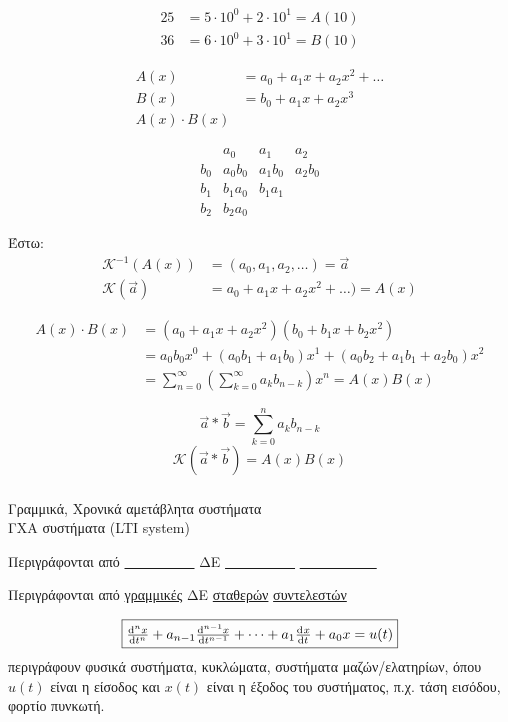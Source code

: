 \documentclass[11pt,a4paper,titlepage,final]{article}
\begin{document}
\begin{align*}
25 &= 5\cdot10^0+2\cdot10^1 = A(10)\\36&=6\cdot10^0+3\cdot10^1 = B(10)
\end{align*}


\begin{align*}
A(x) &= a_0 +a_1x+a_2x^2+\dots\\
B(x) &= b_0+a_1x+a_2x^3\\
A(x) \cdot B(x) &
\end{align*}

	\[
	\begin{array}{r|c|c|c}
	& a_0 & a_1 & a_2  \\ \hline
	b_0 & a_0b_0 & a_1b_0 & a_2b_0 \\ \hline
	b_1 & b_1a_0 & b_1a_1 & \\ \hline
	b_2 & b_2a_0 &        &
	\end{array}
	\]

Έστω: \begin{align*}
\mathscr K^{-1}\left(A(x)\right) &= (a_0,a_1,a_2,\dots) = \vec{a}\\
\mathscr K\left(\vec a\right) &= a_0+a_1x+a_2x^2+ \dots) = A(x)
\end{align*}

\begin{align*}
A(x)\cdot B(x) &= (a_0+a_1x+a_2x^2)(b_0+b_1x+b_2x^2)
\\ &=
a_0b_0 x^0 + (a_0b_1+a_1b_0)x^1 + (a_0b_2+a_1b_1+a_2b_0)x^2
\\ &= \boxed{
\sum_{n=0}^\infty \left(
\sum_{k=0}^\infty a_k b_{n-k}
\right) x^n = A(x)B(x)}
\end{align*}

\[
\vec a * \vec b = \sum_{k=0}^n a_k b_{n-k}
\]
\[
\mathscr K(\vec a * \vec b)  = A(x)B(x)
\]

\subsubsection{}
Γραμμικά, Χρονικά αμετάβλητα συστήματα\\
ΓΧΑ συστήματα (\textlatin{LTI system})

Περιγράφονται από \underline{\ \ \ \ \ \ \ \ \ \ } ΔΕ \underline{\ \ \ \ \ \ \ \ \ \ } \underline{\ \ \ \ \ \ \ \ \ \ \ }

Περιγράφονται από \underline{γραμμικές} ΔΕ \underline{σταθερών} \underline{συντελεστών}

\[
\boxed{
\od[n]{x}{t} + a_{n-1}\od[n-1]{x}{t} + \dots + a_1\od{x}{t} + a_0x = u(t)
}
\]
περιγράφουν φυσικά συστήματα, κυκλώματα, συστήματα μαζών/ελατηρίων, όπου \(u(t)\) είναι η είσοδος και \(x(t)\) είναι η έξοδος του συστήματος, π.χ. τάση εισόδου, φορτίο πυνκωτή.
\end{document}
